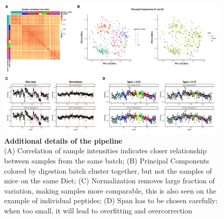 \documentclass[num-refs]{wiley-article}
\begin{document}
\begin{figure}
	\includegraphics[width=\textwidth]{figures/SuppFig3_pipeline_extras.pdf}
	
	\caption{\textbf{Additional details of the pipeline} \\
		\footnotesize (A) Correlation of sample intensities indicates closer relationship between samples from the same batch; (B) Principal Components colored by digestion batch cluster together, but not the samples of mice on the same Diet; (C) Normalization removes large fraction of variation, making samples more comparable, this is also seen on the example of individual peptides; (D) Span has to be chosen carefully: when too small, it will lead to overfitting and overcorrection}
	\label{fig:batch_figS3_pipeline_extra}
\end{figure}
\end{document}
